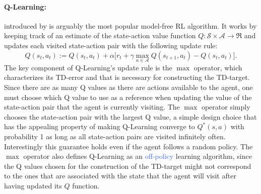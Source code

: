 \paragraph{Q-Learning:} introduced by \citet{watkins1992q} is arguably the most popular model-free RL algorithm. It works by keeping track of an estimate of the state-action value function $Q: \mathcal{S} \times \mathcal{A} \rightarrow \Re$ and updates each visited state-action pair with the following update rule:
\begin{equation}
Q(s_t,a_t):=Q(s_t,a_t) + \alpha\big[r_t + \gamma \underset{a\in \mathcal{A}}{\max} Q(s_{t+1},a_t) - Q(s_t, a_t) \big].
\label{eq:q_learning}
\end{equation}
The key component of Q-Learning's update rule is the $\max$ operator, which characterizes its TD-error and that is necessary for constructing the TD-target. Since there are as many Q values as there are actions available to the agent, one must choose which Q value to use as a reference when updating the value of the state-action pair that the agent is currently visiting. The $\max$ operator simply chooses the state-action pair with the largest Q value, a simple design choice that has the appealing property of making Q-Learning converge to $Q^{*}(s, a)$ with probability 1 as long as all state-action pairs are visited infinitely often. Interestingly this guarantee holds even if the agent follows a random policy. The $\max$ operator also defines Q-Learning as an \textcolor{RoyalBlue}{off-policy} learning algorithm, since the Q values chosen for the construction of the TD-target might not correspond to the ones that are associated with the state that the agent will visit after having updated its $Q$ function.

